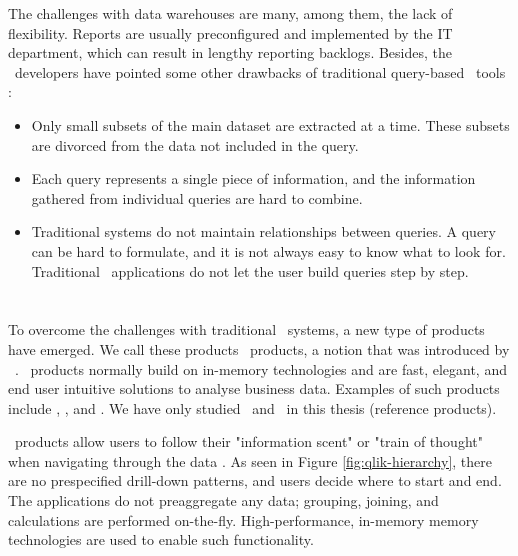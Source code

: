 The challenges with data warehouses are many, among them, the lack of flexibility. Reports are usually preconfigured and implemented by the IT department, which can result in lengthy reporting backlogs. Besides, the \qlikview~developers have pointed some other drawbacks of traditional query-based \bi~tools \cite{Qlik2010-ya}:
\begin{itemize}
  \item Only small subsets of the main dataset are extracted at a time. These subsets are divorced from the data not included in the query.
  \item Each query represents a single piece of information, and the information gathered from individual queries are hard to combine.
  \item Traditional systems do not maintain relationships between queries. A query can be hard to formulate, and it is not always easy to know what to look for. Traditional \bi~applications do not let the user build queries step by step.
\end{itemize}

\section{\bd}
\label{sec:Business Discovery}
To overcome the challenges with traditional \bi~systems, a new type of products have emerged. We call these products \bd~products, a notion that was introduced by \qlikview~\cite{Qlik2014-vd}. \bd~products normally build on in-memory technologies and are fast, elegant, and end user intuitive solutions to analyse business data. Examples of such products include \powerpivot, \tableau, and \qlikview. We have only studied \qlikview~and \tableau~in this thesis (reference products). 


\bd~products allow users to follow their "information scent" or "train of thought" when navigating through the data \cite{Kamkolkar2015-iq, Qlik2014-vd}. As seen in Figure \ref{fig:qlik-hierarchy}, there are no prespecified drill-down patterns, and users decide where to start and end. The applications do not preaggregate any data; grouping, joining, and calculations are performed on-the-fly. High-performance, in-memory memory technologies are used to enable such functionality.

